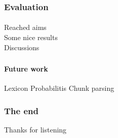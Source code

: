 \documentclass[10pt]{beamer}
\renewcommand{\baselinestretch}{1.5}
\begin{document}
\begin{frame}
 \renewcommand{\baselinestretch}{1.0}
\frametitle{Evaluation}
\framesubtitle{} 
Reached aims\\
Some nice results\\
Discussions\\
\end{frame}



\begin{frame}
 \renewcommand{\baselinestretch}{1.0}
\frametitle{}
\framesubtitle{Future work} 
Lexicon
Probabilitis
Chunk parsing
\end{frame}

\begin{frame}
    \frametitle{The end}
\large\begin{center}Thanks for listening\end{center}
\end{frame}
\end{document}

